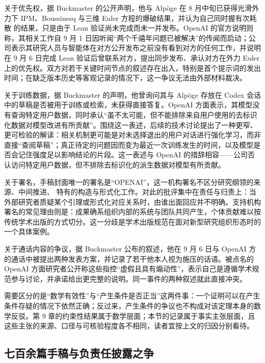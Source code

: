 关于优先权，据 Buckmaster 的公开声明\cite{buckmaster-statement}，他与 Alpöge 在 8 月中旬已获得光滑外力下 IPM、Boussinesq 与三维 Euler 方程的爆破结果，并认为自己同时握有次耗散 \NS{} 的结果，只是由于 Lean 验证尚未完成而未一并发布。OpenAI 的官方说明\cite{openai-blog}则称，其相关工作自 9 月 1 日因听闻“两个千禧年问题已被解决”的传闻而启动；公司表示其研究人员与智能体在对方公开发布之前没有看到对方的任何工作，并说明在 9 月 6 日完成 Lean 验证后曾联系对方，提出同步发布、承认对方在外力 Euler 上的优先权。双方对若干关键时间节点的叙述存在出入，特别是首个提示词的发出时间；在缺乏版本历史等客观记录的情况下，这一争议无法由外部材料裁决。

关于训练数据，据 Buckmaster 的声明\cite{buckmaster-statement}，他曾询问其与 Alpöge 存放在 Codex 会话中的草稿是否被用于训练或检索，未获得直接答复。OpenAI 方面表示，其模型没有查询特定用户数据，同时承认“虽不太可能，但不能排除来自用户使用的去标识化数据对模型改进有所贡献”。围绕这一表述，后续的技术讨论提出了一种更窄、更可检验的解读：相关机制更可能是对未选择退出的用户对话进行强化学习，而非直接“查阅草稿”；真正待定的问题因而变为最近一次训练发生的时间，以及模型是否会记住强度足以影响结论的片段。这一表述与 OpenAI 的措辞相容——公司否认访问特定用户数据，但不排除去标识化的派生数据对模型有所贡献。

关于署名，手稿封面唯一的署名是“OPENAI”，这一机构署名不区分研究纲领的来源、中间推进、\NS{} 特有的构造与形式化工作。对此的批评集中在责任与归责上：当外部研究者质疑某个引理或形式化对应关系时，由谁出面回应并不明确。支持机构署名的常见理由则是：成果确系组织内部的系统与团队共同产生，个体贡献难以按传统学术出版的方式切分。这一分歧是学术出版规范在面对新型研究组织形态时的一个具体案例。

关于通话内容的争议，据 Buckmaster 公布的叙述，他在 9 月 6 日与 OpenAI 方的通话中被提出两种发表方案，并记录了若干他本人视为施压的话语。被点名的 OpenAI 方面研究者公开称这些指控“虚假且具有煽动性”，表示自己是遵循学术规范参与讨论，并承诺给出更完整的说明。同一事件的两种叙述就此直接冲突。

需要区分的是“数学有效性”与“产生条件是否正当”这两件事：一个证明可以在产生条件存疑的情况下依然正确；反过来，产生条件的争议也不构成对该定理本身的数学反驳。第 9 章的约束性结果属于数学层面；本节的记录属于事实主张层面，且这些主张的来源、口径与可核验程度各不相同，读者宜按上文的归因分别看待。

\subsection{七百余篇手稿与负责任披露之争}

